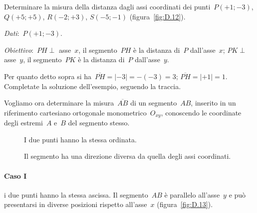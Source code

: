 \begin{exrig}
 \begin{esempio}
 \label{ex:D.14}
Determinare la misura della distanza dagli assi coordinati dei punti~$P(+1;-3)$, $Q(+5;+5)$, $R(-2;+3)$, $S(-5;-1)$ (figura~\ref{fig:D.12}).

\emph{Dati}:~$P(+1;-3)$.

\emph{Obiettivo}:~$PH\perp$ asse~$x$, il segmento~$PH$ è la distanza di~$P$ dall'asse~$x$;
$PK\perp$ asse~$y$, il segmento~$PK$ è la distanza di~$P$ dall'asse~$y$.

Per quanto detto sopra si ha~$\overline{PH}=|-3|=-(-3)=3$; $\overline{PH}=|+1|=1$.
Completate la soluzione dell'esempio, seguendo la traccia.
 \end{esempio}
\end{exrig}

Vogliamo ora determinare la misura~$\overline{AB}$ di un segmento~$AB$, inserito in un riferimento cartesiano ortogonale
monometrico~$O_{xy}$, conoscendo le coordinate degli estremi~$A$ e~$B$ del segmento stesso.

\begin{figure}[t]
 \begin{minipage}[t]{.45\textwidth}
 \centering
 \caption{I due punti hanno la stessa ordinata.}\label{fig:D.14}
 \end{minipage}\hfil
 \begin{minipage}[t]{.45\textwidth}
 \centering
 \caption{Il segmento ha una direzione diversa da quella degli assi coordinati.}\label{fig:D.15}
 \end{minipage}
 \end{figure}

\paragraph{Caso I} i due punti hanno la stessa ascissa. Il segmento~$AB$ è parallelo all'asse~$y$ e può
presentarsi in diverse posizioni rispetto all'asse~$x$ (figura~\ref{fig:D.13}).

